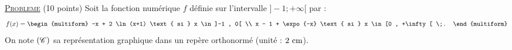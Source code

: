 \noindent \underline{\textsc{Probleme}} (10 points) \newline
      Soit la fonction num\'erique $f$ d\'efinie sur l'intervalle $]-1;+\infty[$ par : 
      \[
            f(x) = 
	            \begin{multiform}
                        -x + 2 \ln (x+1) \text{ si } x \in ]-1 , 0[ \\
                        x - 1 + \expo{-x} \text{ si } x \in [0 , +\infty[ \;.
	            \end{multiform}
      \]
      On note $(\mathscr{C})$ sa représentation graphique dans un repère orthonormé \Oij{} (unité : $2 ~\mathrm{cm}$).
